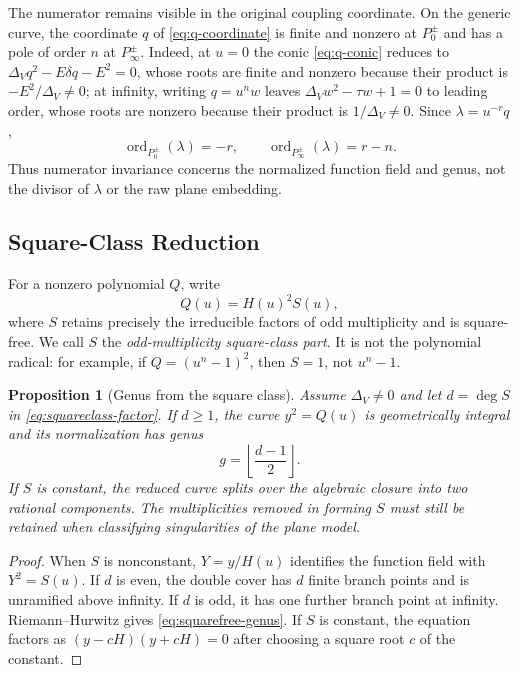 \documentclass[11pt,reqno]{amsart}
\newtheorem{proposition}[theorem]{Proposition}
\theoremstyle{remark}
\begin{document}
The numerator remains visible in the original coupling coordinate.  On the
generic curve, the coordinate $q$ of \eqref{eq:q-coordinate} is finite and
nonzero at $P_0^\pm$ and has a pole of order $n$ at $P_\infty^\pm$.  Indeed,
at $u=0$ the conic \eqref{eq:q-conic} reduces to
$\Delta_Vq^2-E\delta q-E^2=0$, whose roots are finite and nonzero because
their product is $-E^2/\Delta_V\neq0$; at infinity, writing $q=u^nw$ leaves
$\Delta_Vw^2-\tau w+1=0$ to leading order, whose roots are nonzero because
their product is $1/\Delta_V\neq0$.  Since
$\lambda=u^{-r}q$,
\begin{equation}\label{eq:lambda-divisor-orders}
 \operatorname{ord}_{P_0^\pm}(\lambda)=-r,
 \qquad
 \operatorname{ord}_{P_\infty^\pm}(\lambda)=r-n.
\end{equation}
Thus numerator invariance concerns the normalized function field and genus,
not the divisor of $\lambda$ or the raw plane embedding.

\subsection{Square-Class Reduction}

For a nonzero polynomial $Q$, write
\begin{equation}\label{eq:squareclass-factor}
 Q(u)=H(u)^2S(u),
\end{equation}
where $S$ retains precisely the irreducible factors of odd multiplicity and
is square-free.  We call $S$ the \emph{odd-multiplicity square-class part}.
It is not the polynomial radical: for example, if
$Q=(u^n-1)^2$, then $S=1$, not $u^n-1$.

\begin{proposition}[Genus from the square class]\label{prop:squarefree-genus}
Assume $\Delta_V\ne0$ and let $d=\deg S$ in
\eqref{eq:squareclass-factor}.  If $d\geq1$, the curve $y^2=Q(u)$ is
geometrically integral and its normalization has genus
\begin{equation}\label{eq:squarefree-genus}
 g=\left\lfloor\frac{d-1}{2}\right\rfloor.
\end{equation}
If $S$ is constant, the reduced curve splits over the algebraic closure into
two rational components.  The multiplicities removed in forming $S$ must
still be retained when classifying singularities of the plane model.
\end{proposition}

\begin{proof}
When $S$ is nonconstant, $Y=y/H(u)$ identifies the function field with
$Y^2=S(u)$.  If $d$ is even, the double cover has $d$ finite branch points
and is unramified above infinity.  If $d$ is odd, it has one further branch
point at infinity.  Riemann--Hurwitz gives
\eqref{eq:squarefree-genus}.  If $S$ is constant, the equation factors as
$(y-cH)(y+cH)=0$ after choosing a square root $c$ of the constant.
\end{proof}
\end{document}

